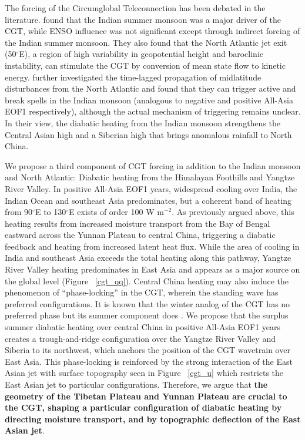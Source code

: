 	The forcing of the Circumglobal Teleconnection has been debated in the literature. \citep{Ding2005a} found that the Indian summer monsoon was a major driver of the CGT, while ENSO influence was not significant except through indirect forcing of the Indian summer monsoon. They also found that the North Atlantic jet exit (50$^{\circ}$E), a region of high variability in geopotential height and baroclinic instability, can stimulate the CGT by conversion of mean state flow to kinetic energy. \citet{Ding2007} further investigated the time-lagged propagation of midlatitude disturbances from the North Atlantic and found that they can trigger active and break spells in the Indian monsoon (analogous to negative and positive All-Asia EOF1 respectively), although the actual mechanism of triggering remains unclear. In their view, the diabatic heating from the Indian monsoon strengthens the Central Asian high and a Siberian high that brings anomalous rainfall to North China.
		
	We propose a third component of CGT forcing in addition to the Indian monsoon and North Atlantic: Diabatic heating from the Himalayan Foothills and Yangtze River Valley. In positive All-Asia EOF1 years, widespread cooling over India, the Indian Ocean and southeast Asia predominates, but a coherent band of heating from 90$^{\circ}$E to 130$^{\circ}$E exists of order 100 W m$^{-2}$. As previously argued above, this heating results from increased moisture transport from the Bay of Bengal eastward across the Yunnan Plateau to central China, triggering a diabatic feedback and heating from increased latent heat flux. While the area of cooling in India and southeast Asia exceeds the total heating along this pathway, Yangtze River Valley heating predominates in East Asia and appears as a major source on the global level (Figure ~\ref{cgt_qq}). Central China heating may also induce the phenomenon of ``phase-locking'' in the CGT, wherein the standing wave has preferred configurations. It is known that the winter analog of the CGT has no preferred phase \citep{Branstator2002} but its summer component does \citep{Ding2005a}. We propose that the surplus summer diabatic heating over central China in positive All-Asia EOF1 years creates a trough-and-ridge configuration over the Yangtze River Valley and Siberia to its northwest, which anchors the position of the CGT wavetrain over East Asia. This phase-locking is reinforced by the strong interaction of the East Asian jet with surface topography seen in Figure ~\ref{cgt_u} which restricts the East Asian jet to particular configurations. Therefore, we argue that \textbf{the geometry of the Tibetan Plateau and Yunnan Plateau are crucial to the CGT, shaping a particular configuration of diabatic heating by directing moisture transport, and by topographic deflection of the East Asian jet}.

